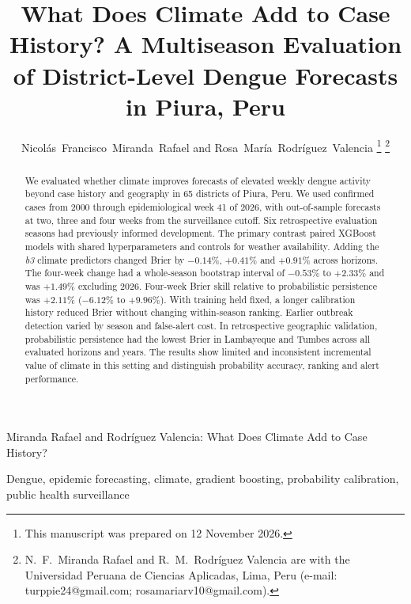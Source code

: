 \documentclass[journal]{IEEEtran}
\newcommand{\bthree}{\textit{b3}}
\begin{document}

\title{What Does Climate Add to Case History? A Multiseason Evaluation of District-Level Dengue Forecasts in Piura, Peru}

\author{Nicol\'as~Francisco~Miranda~Rafael and
        Rosa~Mar\'ia~Rodr\'iguez~Valencia%
\thanks{This manuscript was prepared on 12 November 2026.}%
\thanks{N.~F.~Miranda Rafael and R.~M.~Rodr\'iguez Valencia are with the Universidad Peruana de Ciencias Aplicadas, Lima, Peru (e-mail: turppie24@gmail.com; rosamariarv10@gmail.com).}}

%
{Miranda Rafael and Rodr\'iguez Valencia: What Does Climate Add to Case History?}

\maketitle

\begin{abstract}
We evaluated whether climate improves forecasts of elevated weekly dengue activity beyond case history and geography in 65 districts of Piura, Peru. We used confirmed cases from 2000 through epidemiological week 41 of 2026, with out-of-sample forecasts at two, three and four weeks from the surveillance cutoff. Six retrospective evaluation seasons had previously informed development. The primary contrast paired XGBoost models with shared hyperparameters and controls for weather availability. Adding the \bthree{} climate predictors changed Brier by $-0.14\%$, $+0.41\%$ and $+0.91\%$ across horizons. The four-week change had a whole-season bootstrap interval of $-0.53\%$ to $+2.33\%$ and was $+1.49\%$ excluding 2026. Four-week Brier skill relative to probabilistic persistence was $+2.11\%$ ($-6.12\%$ to $+9.96\%$). With training held fixed, a longer calibration history reduced Brier without changing within-season ranking. Earlier outbreak detection varied by season and false-alert cost. In retrospective geographic validation, probabilistic persistence had the lowest Brier in Lambayeque and Tumbes across all evaluated horizons and years. The results show limited and inconsistent incremental value of climate in this setting and distinguish probability accuracy, ranking and alert performance.
\end{abstract}

\begin{IEEEkeywords}
Dengue, epidemic forecasting, climate, gradient boosting, probability calibration, public health surveillance
\end{IEEEkeywords}
\end{document}
